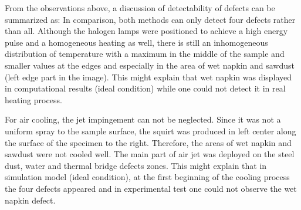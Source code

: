 \documentclass{tQRT2e}
\begin{document}
From the observations above, a discussion of detectability of defects can be summarized as:
In comparison, both methods can only detect four defects rather than all. Although the halogen lamps were positioned to achieve a high energy pulse and a homogeneous heating as well, there is still an inhomogeneous distribution of temperature with a maximum in the middle of the sample and smaller values at the edges and especially in the area of wet napkin and sawdust (left edge part in the image). This might explain that wet napkin was displayed in computational results (ideal condition) while one could not detect it in real heating process. 

For air cooling, the jet impingement can not be neglected. Since it was not a uniform spray to the sample surface, the squirt was produced in left center along the surface of the specimen to the right. Therefore, the areas of wet napkin and sawdust were not cooled well. The main part of air jet was deployed on the steel dust, water and thermal bridge defects zones. This might explain that in simulation model (ideal condition), at the first beginning of the cooling process the four defects appeared and in experimental test one could not observe the wet napkin defect.
\end{document}
